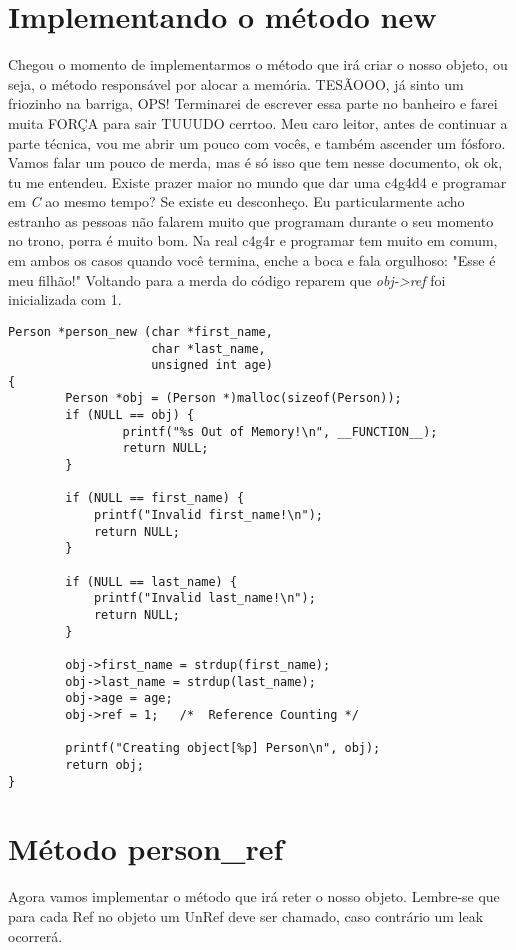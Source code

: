 \section{Implementando o método new}

Chegou o momento de implementarmos o método que irá criar o nosso objeto, ou seja, o método responsável por alocar a memória. TESÃOOO, já sinto um friozinho na barriga, OPS!
Terminarei de escrever essa parte no banheiro e farei muita FORÇA para sair TUUUDO cerrtoo. Meu caro leitor, antes de continuar a parte técnica, vou me abrir um pouco com 
vocês, e também ascender um fósforo. Vamos falar um pouco de merda, mas é só isso que tem nesse documento, ok ok, tu me entendeu. Existe prazer maior no mundo que dar uma 
c4g4d4 e programar em \textit{C} ao mesmo tempo? Se existe eu desconheço. Eu particularmente acho estranho as pessoas não falarem muito que programam durante o seu momento no
trono, porra é muito bom. Na real c4g4r e programar tem muito em comum, em ambos os casos quando você termina, enche a boca e fala orgulhoso: "Esse é meu filhão!" Voltando para a
merda do código reparem que \textit{obj->ref} foi inicializada com 1.

\belowcaptionskip=-10pt
\begin{lstlisting}[label=some-code,caption=person\_new()]
Person *person_new (char *first_name, 
                    char *last_name, 
                    unsigned int age)
{
        Person *obj = (Person *)malloc(sizeof(Person));
        if (NULL == obj) {
                printf("%s Out of Memory!\n", __FUNCTION__);
                return NULL;
        }

        if (NULL == first_name) {
            printf("Invalid first_name!\n");
            return NULL;
        }

        if (NULL == last_name) {
            printf("Invalid last_name!\n");
            return NULL;
        }

        obj->first_name = strdup(first_name);
        obj->last_name = strdup(last_name);
        obj->age = age;
        obj->ref = 1;   /*  Reference Counting */

        printf("Creating object[%p] Person\n", obj);
        return obj;
}

\end{lstlisting}

\vspace{50mm}

\section{Método person\_ref}
Agora vamos implementar o método que irá reter o nosso objeto. Lembre-se que para cada Ref no objeto um UnRef deve ser chamado, caso contrário um leak ocorrerá.

